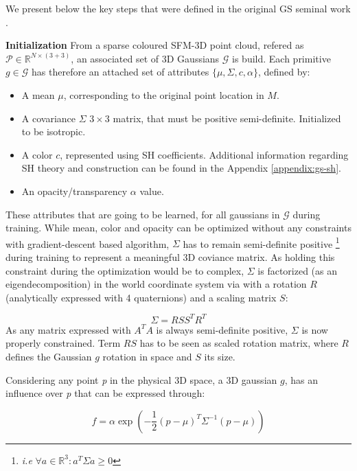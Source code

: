 We present below the key steps that were defined in the original \ac{GS} seminal work \citep{kerbl20233d}.

\noindent \textbf{Initialization} From a sparse coloured \ac{SFM}-3D point cloud, refered as $\mathcal{P}\in\mathbb{R}^{N\times(3+3)}$, an associated set of 3D Gaussians $\mathcal{G}$ is build. Each primitive $g \in \mathcal{G}$ has therefore an attached set of attributes $\{\mu,\Sigma,c,\alpha\}$, defined by: 
\begin{itemize}
    \item A mean $\mu$, corresponding to the original point location in $M$. 
    \item A covariance $\Sigma$ $3\times3$ matrix, that must be positive semi-definite. Initialized to be isotropic. 
    \item A color $c$, represented using \ac{SH} coefficients. Additional information regarding \ac{SH} theory and construction can be found in the Appendix \ref{appendix:gs-sh}. 
    \item An opacity/transparency $\alpha$ value. 
\end{itemize}
These attributes that are going to be learned, for all gaussians in  $\mathcal{G}$ during training. While mean, color and opacity can be optimized without any constraints with gradient-descent based algorithm, $\Sigma$ has to remain semi-definite positive \footnote{\textit{i.e} $ \forall a \in \mathbb{R}^{3}: a^{T}\Sigma a \geq 0$} during training to represent a meaningful 3D coviance matrix. As holding this constraint during the optimization would be to complex, $\Sigma$ is factorized (as an eigendecomposition) in the world coordinate system via with a rotation $R$ (analytically expressed with 4 quaternions) and a scaling matrix $S$: 

\begin{equation}
    \Sigma = RSS^{T}R^{T}
\end{equation}
As any matrix expressed with $A^{T}A$ is always semi-definite positive, $\Sigma$ is now properly constrained. Term $RS$ has to be seen as scaled rotation matrix, where $R$ defines the Gaussian $g$ rotation in space and $S$ its size. 

Considering any point \textit{p} in the physical 3D space, a 3D gaussian $g$, has an influence over \textit{p} that can be expressed through: 

\begin{equation}
  f = \alpha\exp(-\frac{1}{2}(p-\mu)^{T}\Sigma^{-1}(p-\mu))
\end{equation}

